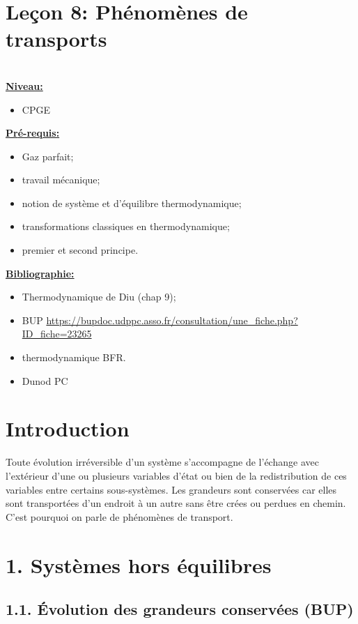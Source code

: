 \documentclass[french, a4paper, 10pt, twocolumn, landscape]{article}
\begin{document}
\section*{Leçon 8: Phénomènes de transports}

\hrulefill\\

\noindent\underline{\textbf{Niveau:}}
\begin{itemize}
  \item CPGE 
\end{itemize}
\underline{\textbf{Pr{\'e}-requis: }}

\begin{itemize}  
  \item Gaz parfait;
  \item travail mécanique; 
  \item notion de système et d’équilibre thermodynamique;
  \item  transformations classiques en thermodynamique;
  \item premier et second principe.
\end{itemize}
\underline{\textbf{Bibliographie:}}

\begin{itemize}
  \item Thermodynamique de Diu (chap 9);
  \item BUP \url{https://bupdoc.udppc.asso.fr/consultation/une_fiche.php?ID_fiche=23265}
  \item thermodynamique BFR.
  \item Dunod PC
\end{itemize}
\hrulefill

\section*{Introduction}

Toute évolution irréversible d'un système s'accompagne de l'échange avec l'extérieur d'une ou plusieurs variables d'état ou bien de la redistribution de ces variables entre certains sous-systèmes. Les grandeurs sont conservées car elles sont transportées d'un endroit à un autre sans être crées ou perdues en chemin. C'est pourquoi on parle de phénomènes de transport.

\section*{1. Systèmes hors équilibres}

\subsection*{1.1. Évolution des grandeurs conservées (BUP)}
\end{document}
